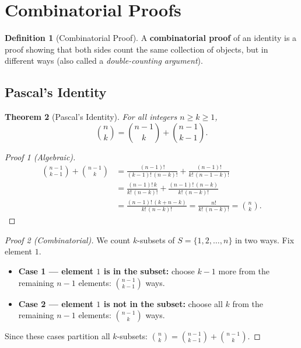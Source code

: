 \documentclass[11pt, a4paper, notitlepage]{report}
\newtheorem{theorem}{Theorem}[section]
\theoremstyle{definition}
\newtheorem{definition}[theorem]{Definition}
\theoremstyle{remark}
\begin{document}
\section{Combinatorial Proofs}
\label{sec:combproof}

\begin{definition}[Combinatorial Proof]
\label{def:combproof}
A \textbf{combinatorial proof} of an identity is a proof showing that both sides count the same
collection of objects, but in different ways (also called a \emph{double-counting argument}).
\end{definition}

\subsection{Pascal's Identity}

\begin{theorem}[Pascal's Identity]
\label{thm:pascal}
For all integers $n \geq k \geq 1$,
\[
  \binom{n}{k} = \binom{n-1}{k} + \binom{n-1}{k-1}.
\]
\end{theorem}

\begin{proof}[Proof 1 (Algebraic)]
\begin{align*}
\binom{n-1}{k-1} + \binom{n-1}{k}
  &= \frac{(n-1)!}{(k-1)!\,(n-k)!} + \frac{(n-1)!}{k!\,(n-1-k)!} \\
  &= \frac{(n-1)!\,k}{k!\,(n-k)!} + \frac{(n-1)!\,(n-k)}{k!\,(n-k)!} \\
  &= \frac{(n-1)!\,(k + n - k)}{k!\,(n-k)!}
   = \frac{n!}{k!\,(n-k)!} = \binom{n}{k}.
\end{align*}
\end{proof}

\begin{proof}[Proof 2 (Combinatorial)]
We count $k$-subsets of $S = \{1, 2, \ldots, n\}$ in two ways. Fix element $1$.
\begin{itemize}
  \item \textbf{Case 1 — element $1$ is in the subset:} choose $k-1$ more from the remaining
        $n-1$ elements: $\binom{n-1}{k-1}$ ways.
  \item \textbf{Case 2 — element $1$ is not in the subset:} choose all $k$ from the remaining
        $n-1$ elements: $\binom{n-1}{k}$ ways.
\end{itemize}
Since these cases partition all $k$-subsets: $\binom{n}{k} = \binom{n-1}{k-1} + \binom{n-1}{k}$.
\end{proof}
\end{document}
